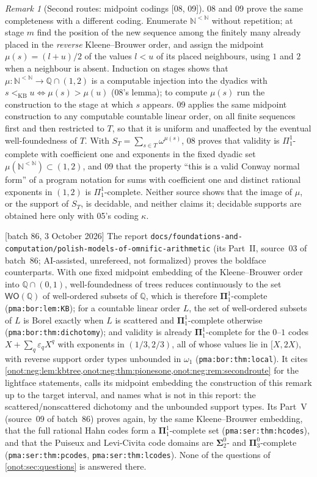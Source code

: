 \documentclass[11pt,oneside]{article}
\numberwithin{equation}{section}
\theoremstyle{definition}
\theoremstyle{remark}
\newtheorem{remark}[remark]{Remark}
\newcommand{\N}{\mathbb N}
\newcommand{\Q}{\mathbb Q}
\newcommand{\kb}{<_{\mathrm{KB}}}
\newcommand{\src}[1]{\textup{\textsf{\small[#1]}}}
\newcommand{\replabel}[1]{\nolinkurl{#1}}
\newcommand{\fn}[1]{\nolinkurl{#1}}
\begin{document}
\begin{remark}[Second routes: midpoint codings \src{08, 09}]\label{onot:neg:rem:secondroute}
08 and 09 prove the same completeness with a different coding. Enumerate
$\N^{<\N}$ without repetition; at stage $m$ find the position of the new sequence
among the finitely many already placed in the \emph{reverse} Kleene--Brouwer order,
and assign the midpoint $\mu(s)=(l+u)/2$ of the values $l<u$ of its placed
neighbours, using $1$ and $2$ when a neighbour is absent. Induction on stages shows
that $\mu:\N^{<\N}\to\Q\cap(1,2)$ is a computable injection into the dyadics with
$s\kb u\iff\mu(s)>\mu(u)$ (08's lemma); to compute $\mu(s)$ run the construction to
the stage at which $s$ appears. 09 applies the same midpoint construction to any
computable countable linear order, on all finite sequences first and then
restricted to $T$, so that it is uniform and unaffected by the eventual
well-foundedness of $T$. With $S_T=\sum_{s\in T}\omega^{\mu(s)}$, 08 proves that
validity is $\Pi^1_1$-complete with coefficient one and exponents in the fixed
dyadic set $\mu(\N^{<\N})\subset(1,2)$, and 09 that the property ``this is a valid
Conway normal form'' of a program notation for sums with coefficient one and
distinct rational exponents in $(1,2)$ is $\Pi^1_1$-complete. Neither source shows
that the image of $\mu$, or the support of $S_T$, is decidable, and neither claims
it; decidable supports are obtained here only with 05's coding $\kappa$.
\end{remark}

\noindent\src{batch 86, 3 October 2026} The report
\fn{docs/foundations-and-computation/polish-models-of-omnific-arithmetic}
(its Part~II, source~03 of batch~86; AI-assisted, unrefereed, not formalized)
proves the boldface counterparts. With one fixed midpoint embedding of the
Kleene--Brouwer order into $\Q\cap(0,1)$, well-foundedness of trees reduces
continuously to the set $\mathsf{WO}(\Q)$ of well-ordered subsets of $\Q$,
which is therefore $\boldsymbol\Pi^1_1$-complete
(\replabel{pma:bor:lem:KB}); for a countable linear order $L$, the set of
well-ordered subsets of $L$ is Borel exactly when $L$ is scattered and
$\boldsymbol\Pi^1_1$-complete otherwise (\replabel{pma:bor:thm:dichotomy});
and validity is already $\boldsymbol\Pi^1_1$-complete for the $0$--$1$
codes $X+\sum_q\varepsilon_qX^q$ with exponents in $(1/3,2/3)$, all of whose
values lie in $[X,2X)$, with reverse support order types unbounded in
$\omega_1$ (\replabel{pma:bor:thm:local}). It cites
\cref{onot:neg:lem:kbtree,onot:neg:thm:pionesone,onot:neg:rem:secondroute}
for the lightface statements, calls its midpoint embedding the construction
of this remark up to the target interval, and names what is not in this
report: the scattered/nonscattered dichotomy and the unbounded support
types. Its Part~V (source~09 of batch~86) proves again, by the same
Kleene--Brouwer embedding, that the full rational Hahn codes form a
$\boldsymbol\Pi^1_1$-complete set (\replabel{pma:ser:thm:hcodes}), and that
the Puiseux and Levi-Civita code domains are $\boldsymbol\Sigma^0_2$- and
$\boldsymbol\Pi^0_3$-complete (\replabel{pma:ser:thm:pcodes},
\replabel{pma:ser:thm:lcodes}). None
of the questions of \cref{onot:sec:questions} is answered there.
\end{document}
